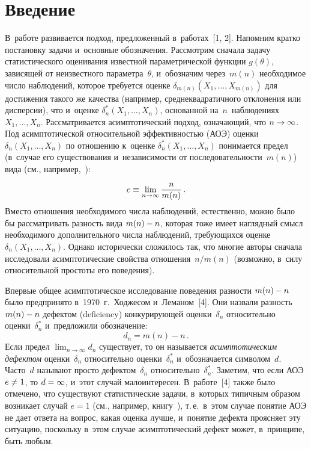 \begin{multicols}{2}

\label{st\stat}

\section{Введение}

В~работе развивается подход, предложенный в~ра\-бо\-тах~[1, 2]. Напомним
кратко постановку задачи и~основные обозначения. Рассмотрим сначала
задачу статистического оценивания известной пара\-мет\-ри\-че\-ской функции
$g(\theta)$, зависящей от неизвестного параметра~$\theta$, 
и~обозначим через~$m(n)$ необходимое число наблюдений, которое
требуется оценке $\delta_{m(n)}(X_1,\ldots,X_{m(n)})$ для достижения
такого же качества (например, среднеквадратичного отклонения или
дисперсии), что и~оценке $\delta^*_{n}(X_1,\ldots,X_{n})$,
основанной на~$n$~наблюдениях $X_1,\ldots,X_n$. Рас\-смат\-ри\-ва\-ет\-ся
асимптотический подход, означающий, что $n \hm\to \infty$. Под
асимптотической относительной эффективностью (АОЭ) оценки
$\delta_n(X_1,\ldots,X_n)$ по отношению к~оценке
$\delta^*_{n}(X_1,\ldots,X_{n})$ понимается предел (в~случае его
существования и~не\-за\-ви\-си\-мости от по\-сле\-до\-ва\-тель\-ности~$m(n)$) вида
(см., например,~\cite[с.~305]{4-ben}):
$$
e \equiv \lim\limits_{n\to\infty} \displaystyle\frac{\displaystyle n\mathstrut}{\displaystyle m(n)\mathstrut}\,.
$$
Вместо отношения необходимого числа наблюдений, естественно, можно
было бы рассматривать разность вида $m(n) \hm- n$, которая тоже имеет
наглядный смысл необходимого дополнительного числа наблюдений,
требующихся оценке $\delta_n(X_1,\ldots,X_n)$. Однако исторически
сложилось так, что многие авторы сначала исследовали асимптотические
свойства отношения~$n/m(n)$ (возможно, в~силу относительной простоты
его поведения).

Впервые общее асимптотическое исследование поведения разности $m(n)
\hm- n$ было предпринято в~1970~г.\ Ходжесом и~Леманом~[4]. 
Они назвали разность $m(n) \hm- n$ дефектом (deficiency)
конкурирующей оценки~$\delta_n$ относительно оценки~$\delta^*_n$ 
и~предложили обозначение:
\begin{equation}
d_n = m(n) - n\,.
\label{e1.1}
\end{equation}
Если предел $\lim_{n\to\infty} d_n$ существует, то он называется
\textit{асимптотическим дефектом} оценки~$\delta_n$ относительно 
оценки~$\delta^*_n$ и~обозначается символом~$d$. Часто~$d$ называют просто
дефектом~$\delta_n$ относительно~$\delta_n^*$. Заметим, что если АОЭ
$e\hm \ne 1$, то $d\hm = \infty$, и~этот случай малоинтересен. В~работе~[4] 
также было отмечено, что существуют статистические задачи, 
в~которых типичным образом возникает случай $e = 1$ (см., например,
книгу~\cite{5-ben}), т.\,е.\ в~этом случае понятие АОЭ не дает ответа на
вопрос, какая оценка лучше, и~понятие дефекта проясняет эту ситуацию,
поскольку в~этом случае асимптотический дефект может, в~принципе,
быть любым.


\end{multicols}
